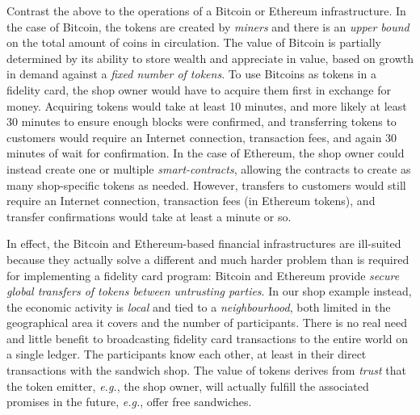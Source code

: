 \documentclass[sigplan,screen,10pt]{acmart}
\begin{document}
Contrast the above to the operations of a Bitcoin or Ethereum infrastructure. In the case of Bitcoin, the tokens are created by \textit{miners} and there is an \textit{upper bound} on the total amount of coins in circulation. 
The value of Bitcoin is partially determined by its ability to store wealth and appreciate in value, based on growth in demand against a \textit{fixed number of tokens}. To use Bitcoins as tokens in a fidelity card, the shop owner would have to acquire them first in exchange for money. Acquiring tokens would take at least 10 minutes, and more likely at least 30 minutes to ensure enough blocks were confirmed, and transferring tokens to customers would require an Internet connection, transaction fees, and again 30 minutes of wait for confirmation. In the case of Ethereum, the shop owner could instead create one or multiple \textit{smart-contracts}, allowing the contracts to create as many shop-specific tokens as needed. However, transfers to customers would still require an Internet connection, transaction fees (in Ethereum tokens), and transfer confirmations would take at least a minute or so. %

In effect, the Bitcoin and Ethereum-based financial infrastructures are ill-suited because they actually solve a different and much harder problem than is required for implementing a fidelity card program: Bitcoin and Ethereum provide \textit{secure global transfers of tokens between untrusting parties}. In our shop example instead, the economic activity is \textit{local} and tied to a \textit{neighbourhood}, both limited in the geographical area it covers and the number of participants. There is no real need and little benefit to broadcasting fidelity card transactions to the entire world on a single ledger. The participants know each other, at least in their direct transactions with the sandwich shop. The value of tokens derives from \textit{trust} that the token emitter, \textit{e.g.}, the shop owner, will actually fulfill the associated promises in the future, \textit{e.g.}, offer free sandwiches. 
\end{document}
